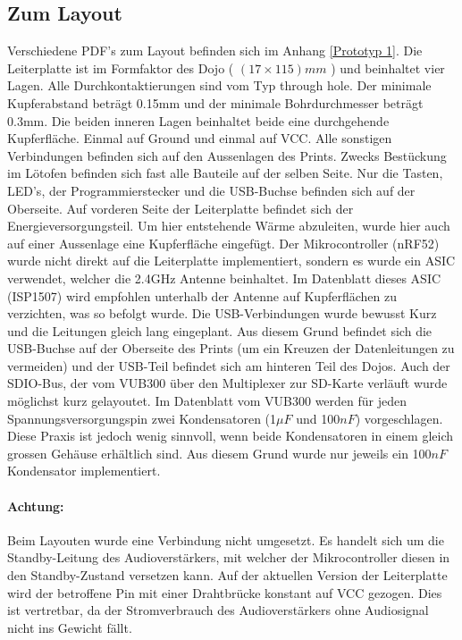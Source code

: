 \newpage

\subsection{Zum Layout}
    Verschiedene PDF's zum Layout befinden sich im Anhang \ref{Prototyp 1}.
    Die Leiterplatte ist im Formfaktor des Dojo ( \( (17\times 115)mm \) ) und beinhaltet vier Lagen. 
    Alle Durchkontaktierungen sind vom Typ through hole. 
    Der minimale Kupferabstand beträgt 0.15mm und der minimale Bohrdurchmesser beträgt 0.3mm.
    Die beiden inneren Lagen beinhaltet beide eine durchgehende Kupferfläche. 
    Einmal auf Ground und einmal auf VCC.
    Alle sonstigen Verbindungen befinden sich auf den Aussenlagen des Prints.
    Zwecks Bestückung im Lötofen befinden sich fast alle Bauteile auf der selben Seite. 
    Nur die Tasten, LED's, der Programmierstecker und die USB-Buchse befinden sich auf der Oberseite.
    Auf vorderen Seite der Leiterplatte befindet sich der Energieversorgungsteil. 
    Um hier entstehende Wärme abzuleiten, wurde hier auch auf einer Aussenlage eine Kupferfläche eingefügt.
    Der Mikrocontroller (nRF52) wurde nicht direkt auf die Leiterplatte implementiert, sondern es wurde ein ASIC verwendet, welcher die 2.4GHz Antenne beinhaltet.
    Im Datenblatt dieses ASIC (ISP1507) wird empfohlen unterhalb der Antenne auf Kupferflächen zu verzichten, was so befolgt wurde.
    Die USB-Verbindungen wurde bewusst Kurz und die Leitungen gleich lang eingeplant. 
    Aus diesem Grund befindet sich die USB-Buchse auf der Oberseite des Prints (um ein Kreuzen der Datenleitungen zu vermeiden) und der USB-Teil befindet sich am hinteren Teil des Dojos.
    Auch der SDIO-Bus, der vom VUB300 über den Multiplexer zur SD-Karte verläuft wurde möglichst kurz gelayoutet. 
    Im Datenblatt vom VUB300 werden für jeden Spannungsversorgungspin zwei Kondensatoren (1\(\mu F\) und 100\(nF\)) vorgeschlagen. 
    Diese Praxis ist jedoch wenig sinnvoll, wenn beide Kondensatoren in einem gleich grossen Gehäuse erhältlich sind.
    Aus diesem Grund wurde nur jeweils ein 100\(nF\) Kondensator implementiert. 
    
    \vspace{0.2cm}
    
    \paragraph{Achtung:} Beim Layouten wurde eine Verbindung nicht umgesetzt. Es handelt sich um die Standby-Leitung des Audioverstärkers, mit welcher der Mikrocontroller diesen in den Standby-Zustand versetzen kann.
    Auf der aktuellen Version der Leiterplatte wird der betroffene Pin mit einer Drahtbrücke konstant auf VCC gezogen. 
    Dies ist vertretbar, da der Stromverbrauch des Audioverstärkers ohne Audiosignal nicht ins Gewicht fällt.
    
